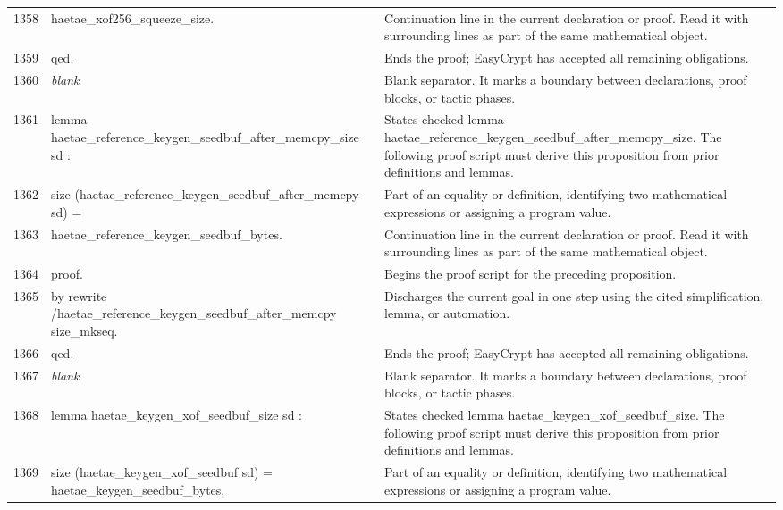 \documentclass[10pt]{article}
\begin{document}
\begin{longtable}{r L{0.53\textwidth} L{0.37\textwidth}}
1358 & {\ttfamily\scriptsize            haetae\_xof256\_squeeze\_size.} & Continuation line in the current declaration or proof.  Read it with surrounding lines as part of the same mathematical object. \\
1359 & {\ttfamily\scriptsize qed.} & Ends the proof; EasyCrypt has accepted all remaining obligations. \\
1360 & {\ttfamily\scriptsize \emph{blank}} & Blank separator.  It marks a boundary between declarations, proof blocks, or tactic phases. \\
1361 & {\ttfamily\scriptsize lemma haetae\_reference\_keygen\_seedbuf\_after\_memcpy\_size sd :} & States checked lemma haetae\_reference\_keygen\_seedbuf\_after\_memcpy\_size.  The following proof script must derive this proposition from prior definitions and lemmas. \\
1362 & {\ttfamily\scriptsize   size (haetae\_reference\_keygen\_seedbuf\_after\_memcpy sd) =} & Part of an equality or definition, identifying two mathematical expressions or assigning a program value. \\
1363 & {\ttfamily\scriptsize   haetae\_reference\_keygen\_seedbuf\_bytes.} & Continuation line in the current declaration or proof.  Read it with surrounding lines as part of the same mathematical object. \\
1364 & {\ttfamily\scriptsize proof.} & Begins the proof script for the preceding proposition. \\
1365 & {\ttfamily\scriptsize by rewrite /haetae\_reference\_keygen\_seedbuf\_after\_memcpy size\_mkseq.} & Discharges the current goal in one step using the cited simplification, lemma, or automation. \\
1366 & {\ttfamily\scriptsize qed.} & Ends the proof; EasyCrypt has accepted all remaining obligations. \\
1367 & {\ttfamily\scriptsize \emph{blank}} & Blank separator.  It marks a boundary between declarations, proof blocks, or tactic phases. \\
1368 & {\ttfamily\scriptsize lemma haetae\_keygen\_xof\_seedbuf\_size sd :} & States checked lemma haetae\_keygen\_xof\_seedbuf\_size.  The following proof script must derive this proposition from prior definitions and lemmas. \\
1369 & {\ttfamily\scriptsize   size (haetae\_keygen\_xof\_seedbuf sd) = haetae\_keygen\_seedbuf\_bytes.} & Part of an equality or definition, identifying two mathematical expressions or assigning a program value. \\

\end{longtable}
\end{document}
